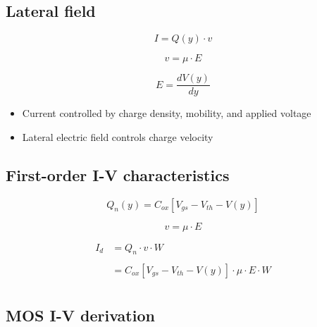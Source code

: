 \documentclass[11pt]{article}
\providecommand{\tightlist}{%
      \setlength{\itemsep}{0pt}\setlength{\parskip}{0pt}}
\begin{document}
    \hypertarget{lateral-field}{%
\subsection{Lateral field}\label{lateral-field}}

    

    \begin{equation}
I = Q(y) \cdot v
\end{equation}

\begin{equation}
v = \mu \cdot E
\end{equation}

\begin{equation}
E = \dfrac{dV(y)}{dy}
\end{equation}

    \begin{itemize}
\tightlist
\item
  Current controlled by charge density, mobility, and applied voltage
\item
  Lateral electric field controls charge velocity
\end{itemize}

    \hypertarget{first-order-i-v-characteristics}{%
\subsection{First-order I-V
characteristics}\label{first-order-i-v-characteristics}}

    

    \begin{equation}
Q_n(y) = C_{ox}[V_{gs} - V_{th} - V(y)]
\end{equation}

\begin{equation}
v = \mu \cdot E
\end{equation}

\begin{align}
I_d &= Q_n \cdot v \cdot W \\
\\
&= C_{ox}[V_{gs} - V_{th} - V(y)] \cdot \mu \cdot E \cdot W \\
\end{align}

    \hypertarget{mos-i-v-derivation}{%
\subsection{MOS I-V derivation}\label{mos-i-v-derivation}}
\end{document}
